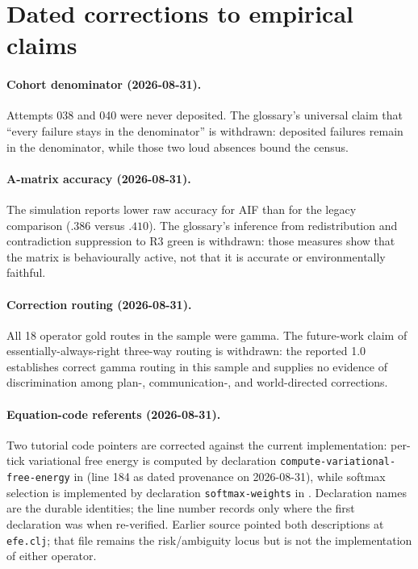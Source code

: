 \section{Dated corrections to empirical claims}

\paragraph{Cohort denominator (2026-08-31).}
Attempts 038 and 040 were never deposited.  The glossary's universal claim that ``every failure stays in the denominator'' is withdrawn: deposited failures remain in the denominator, while those two loud absences bound the census.

\paragraph{A-matrix accuracy (2026-08-31).}
The simulation reports lower raw accuracy for AIF than for the legacy comparison ($.386$ versus $.410$).  The glossary's inference from redistribution and contradiction suppression to R3 green is withdrawn: those measures show that the matrix is behaviourally active, not that it is accurate or environmentally faithful.

\paragraph{Correction routing (2026-08-31).}
All 18 operator gold routes in the sample were gamma.  The future-work claim of essentially-always-right three-way routing is withdrawn: the reported 1.0 establishes correct gamma routing in this sample and supplies no evidence of discrimination among plan-, communication-, and world-directed corrections.

\paragraph{Equation-code referents (2026-08-31).}
Two tutorial code pointers are corrected against the current implementation: per-tick variational free energy is computed by declaration \texttt{compute-variational-free-energy} in  (line 184 as dated provenance on 2026-08-31), while softmax selection is implemented by declaration \texttt{softmax-weights} in .  Declaration names are the durable identities; the line number records only where the first declaration was when re-verified. Earlier source pointed both descriptions at \texttt{efe.clj}; that file remains the risk/ambiguity locus but is not the implementation of either operator.

